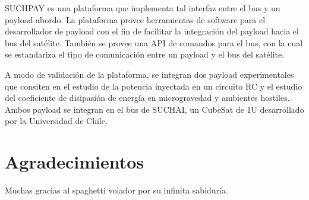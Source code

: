 \begin{preface}
\begin{myAbstract}


SUCHPAY es una plataforma que implementa tal interfaz entre el bus y un payload abordo. La plataforma provee herramientas de software para el desarrollador de payload con el fin de facilitar la integración del payload hacia el bus del satélite. También se provee una API de comandos para el bus, con la cual se estandariza el tipo de  comunicación entre un payload y el bus del satélite.

A modo de validación de la plataforma, se integran dos payload experimentales que consiten en el estudio de la potencia inyectada en un circuito RC y el estudio del coeficiente de disipasión de energía en microgravedad y ambientes hostiles. Ambos payload se integran en el bus de SUCHAI, un CubeSat de 1U desarrollado por la Universidad de Chile.

\end{myAbstract}

\section{Agradecimientos}
Muchas gracias al spaghetti volador por su infinita sabiduría.
\begin{flushright}
\makeatletter
	\@author
\makeatother
\end{flushright}

\tableofcontents

\listoftables

\listoffigures

\end{preface}